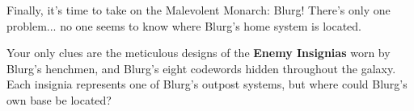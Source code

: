 Finally, it's time to take on the Malevolent Monarch: Blurg!
There's only one problem... no one seems to know where Blurg's
home system is located.

Your only clues are the meticulous designs of the
\textbf{Enemy Insignias} worn by Blurg's henchmen,
and Blurg's eight codewords hidden throughout the galaxy.
Each insignia represents one of Blurg's outpost systems,
but where could Blurg's own base be located?
